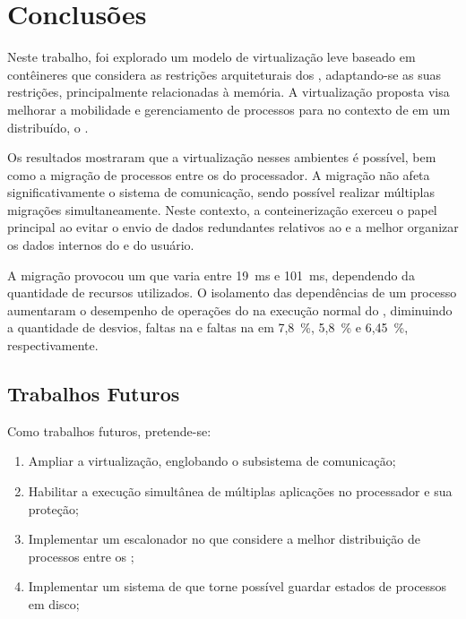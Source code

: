\glsresetall
\chapter{Conclusões}
\label{chap.conclusions}

Neste trabalho, foi explorado um modelo de virtualização leve baseado em contêineres que considera as restrições arquiteturais dos \lws, adaptando-se as suas restrições, principalmente relacionadas à memória. A virtualização proposta visa melhorar a mobilidade e gerenciamento de processos para \lws no contexto de em um \os distribuído, o \nanvix.
%

Os resultados mostraram que a virtualização nesses ambientes é possível, bem como a migração de processos entre os \clusters do processador. A migração não afeta significativamente o sistema de comunicação, sendo possível realizar múltiplas migrações simultaneamente. Neste contexto, a conteinerização exerceu o papel principal ao evitar o envio de dados redundantes relativos ao  e a melhor organizar os dados internos do  e do usuário. 

A migração provocou um \downtime que varia entre 19~ms e 101~ms, dependendo da quantidade de recursos utilizados. O isolamento das dependências de um processo aumentaram o desempenho de operações do  na execução normal do \so, diminuindo a quantidade de desvios, faltas na \dcache e faltas na \icache em 7,8~\%, 5,8~\% e 6,45~\%, respectivamente.

\section{Trabalhos Futuros}
Como trabalhos futuros, pretende-se:

\begin{enumerate}[label=(\roman*)]
    \item Ampliar a virtualização, englobando o subsistema de comunicação;
    \item Habilitar a execução simultânea de múltiplas aplicações no processador e sua proteção;
    \item Implementar um escalonador no \nanvix que considere a melhor distribuição de processos entre os \clusters;
    \item Implementar um sistema de \checkpointing que torne possível guardar estados de processos em disco;
\end{enumerate}

